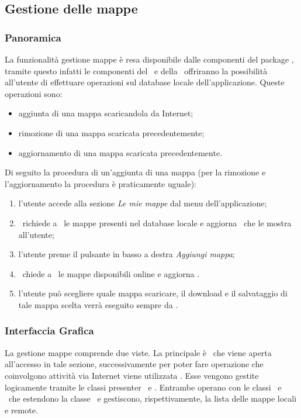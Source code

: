 \documentclass[../Funzionalita.tex]{subfiles}
\begin{document}
	\subsection{Gestione delle mappe}
	\label{subsec:GestioneMappe}
	
		\subsubsection{Panoramica}
			La funzionalità gestione mappe è resa disponibile dalle componenti del package \service, tramite questo infatti le componenti del \presenter\ e della \view\ offriranno la possibilità all'utente di effettuare operazioni sul database locale dell'applicazione. Queste operazioni sono:
			\begin{itemize}
				\item aggiunta di una mappa scaricandola da Internet;
				\item rimozione di una mappa scaricata precedentemente;
				\item aggiornamento di una mappa scaricata precedentemente.
			\end{itemize}
			Di seguito la procedura di un'aggiunta di una mappa (per la rimozione e l'aggiornamento la procedura è praticamente uguale):
			\begin{enumerate}
				\item l'utente accede alla sezione \textit{Le mie mappe} dal menu dell'applicazione;
				\item \LocalMapActivity\ richiede a \DatabaseService\ le mappe presenti nel database locale e aggiorna \LocalMapManagerViewImp\ che le mostra all'utente;
				\item  l'utente preme il pulsante in basso a destra \textit{Aggiungi mappa};
				\item \RemoteMapManagerActivity\ chiede a \DatabaseService\ le mappe disponibili online e aggiorna \RemoteMapManagerViewImp.
				\item l'utente può scegliere quale mappa scaricare, il download e il salvataggio di tale mappa scelta verrà eseguito sempre da \DatabaseService.
			\end{enumerate}
			
		\newpage
		\subsubsection{Interfaccia Grafica}
			La gestione mappe comprende due viste. La principale è \LocalMapManagerView\ che viene aperta all'accesso in tale sezione, successivamente per poter fare operazione che coinvolgono attività via Internet viene utilizzata \RemoteMapManagerView. Esse vengono gestite logicamente tramite le classi presenter \LocalMapActivity\ e \RemoteMapManagerActivity. Entrambe operano con le classi \LocalMapAdapter\ e \RemoteMapManagerAdapter\ che estendono la classe \BaseAdapter\ e gestiscono, rispettivamente, la lista delle mappe locali e remote.
			
\end{document}
